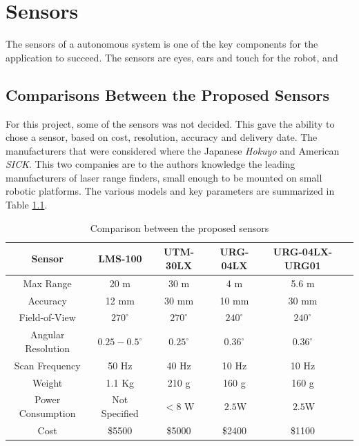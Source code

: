 

\chapter{Sensors}
\label{chap3-sensors}
The sensors of a autonomous system is one of the key components for the application to
succeed. The sensors are eyes, ears and touch for the robot, and 

\section{Comparisons Between the Proposed Sensors}
For this project, some of the sensors was not decided. This gave the ability to chose a
sensor, based on cost, resolution, accuracy and delivery date. The manufacturers that were
considered where the Japanese \emph{Hokuyo} and American \emph{SICK}. This two companies are to the
authors knowledge the leading manufacturers of laser range finders, small enough to be
mounted on small robotic platforms. The various models and key parameters are summarized
in Table \ref{chap3:tab-sensors}.
\begin{table}[htbp]
    \begin{tabular}{|c|c|c|c|c|c|}
        \hline
        Sensor              & LMS-100 & UTM-30LX & URG-04LX & URG-04LX-URG01 \\
        \hline
        Max Range           & 20 m    & 30 m     & 4 m      & 5.6 m          \\
        Accuracy            & 12 mm   & 30 mm    & 10 mm    & 30 mm          \\
        Field-of-View       & $270^\circ$& $270^\circ$ & $240^\circ$ & $240^\circ$  \\
        Angular Resolution  & $0.25-0.5^\circ$  & $0.25^\circ$ & $0.36^\circ$ & $0.36^\circ$  \\
        Scan Frequency      & 50 Hz   &  40 Hz   & 10 Hz    & 10 Hz          \\
        Weight              & 1.1 Kg  &  210 g    & 160 g    & 160 g          \\
        Power Consumption   & Not Specified  & $<8 $ W & $~2.5$W  &$~2.5$W  \\
        \hline
        Cost                & \$5500  & \$5000   & \$2400   & \$1100         \\
        \hline
    \end{tabular}
    \caption{Comparison between the proposed sensors}
    \label{chap3:tab-sensors}
\end{table}

